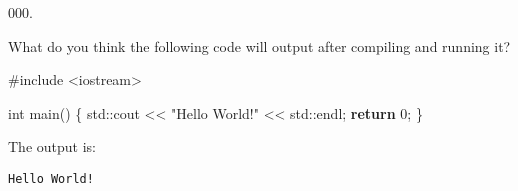 \documentclass[]{book}
\newenvironment{Shaded}{}{}
\newcommand{\BuiltInTok}[1]{#1}
\newcommand{\ControlFlowTok}[1]{\textcolor[rgb]{0.00,0.44,0.13}{\textbf{#1}}}
\newcommand{\DataTypeTok}[1]{\textcolor[rgb]{0.56,0.13,0.00}{#1}}
\newcommand{\DecValTok}[1]{\textcolor[rgb]{0.25,0.63,0.44}{#1}}
\newcommand{\ImportTok}[1]{#1}
\newcommand{\NormalTok}[1]{#1}
\newcommand{\PreprocessorTok}[1]{\textcolor[rgb]{0.74,0.48,0.00}{#1}}
\newcommand{\StringTok}[1]{\textcolor[rgb]{0.25,0.44,0.63}{#1}}
\begin{document}
\begin{minipage}{\linewidth}\noindent
{\tiny 000.}\\
\begin{minipage}[t]{.485\linewidth}

What do you think the following code will output after compiling and
running it?

\begin{framed}

\begin{Shaded}
\begin{Highlighting}[]
\PreprocessorTok{#include }\ImportTok{<iostream>}

\DataTypeTok{int}\NormalTok{ main()}
\NormalTok{\{}
  \BuiltInTok{std::}\NormalTok{cout << }\StringTok{"Hello World!"}\NormalTok{ << }\BuiltInTok{std::}\NormalTok{endl;}
  \ControlFlowTok{return} \DecValTok{0}\NormalTok{;}
\NormalTok{\}}
\end{Highlighting}
\end{Shaded}

\end{framed}

\end{minipage}
\hfill
\begin{minipage}[t]{.485\linewidth}

The output is:

\begin{framed}

\begin{verbatim}
Hello World!
\end{verbatim}

\end{framed}

\end{minipage}
\end{minipage}

\vspace{2mm}\noindent\hrulefill{}
\end{document}
